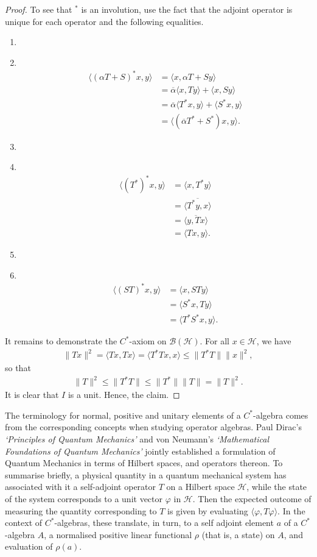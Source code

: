 \documentclass[12pt,a4paper]{report}
\theoremstyle{plain}
\theoremstyle{definition}
\newcommand{\1}{\mathbbm{1}}
\renewcommand{\H}{\mathcal{H}}
\newcommand{\B}{\mathcal{B}}
\newcommand{\BH}{\mathcal{\B(\H)}}
\renewcommand{\phi}{\varphi}
\newcommand\Item[1][]{ 				%
  \ifx\relax#1\relax  \item \else \item[#1] \fi
  \abovedisplayskip=0pt\abovedisplayshortskip=0pt~\vspace*{-\baselineskip}}
\begin{document}
\begin{proof}
	To see that $^\ast$ is an involution, use the fact that the adjoint 
	operator is unique for each operator and the following equalities.
	\begin{enumerate}
	\Item	\begin{align*}
				\langle (\alpha T+S)^\ast x,y\rangle 
			&=	\langle x, \alpha T+S y \rangle									\\
			&=	\overline{\alpha}\langle x,Ty\rangle + \langle x, Sy \rangle	\\
			&=	\overline{\alpha}\langle T^\ast x,y\rangle +
										 \langle S^\ast x, y \rangle			\\
			&=	\langle(\overline{\alpha} T^\ast + S^\ast) x, y \rangle.
			\end{align*}
	\Item 	\begin{align*}
				\langle (T^\ast)^\ast x,y\rangle 
			&=	\langle x, T^\ast y \rangle										\\
			&=	\overline{\langle T^\ast y,x \rangle}							\\
			&=	\overline{\langle y, Tx \rangle}								\\
			&=	\langle Tx,y\rangle.
			\end{align*}
	\Item	\begin{align*}
				\langle (ST)^\ast x,y \rangle
			&=	\langle x, STy \rangle											\\
			&=	\langle	S^\ast x,Ty \rangle										\\
			&=	\langle T^\ast S^\ast x,y \rangle.
		\end{align*}
	\end{enumerate}
	It remains to demonstrate the $C^\ast$-axiom on $\BH$. For all $x\in\H$, we have
	\begin{align*}
		\|Tx\|^2 = \langle Tx,Tx\rangle = \langle T^\ast Tx,x\rangle \leq \|T^\ast T\| \|x\|^2,
	\end{align*}
	so that
	\begin{align*}
		\|T\|^2 \leq \|T^\ast T\| \leq \|T^\ast\| \|T\| = \|T\|^2.
	\end{align*}
	It is clear that $I$ is a unit.
	Hence, the claim.
\end{proof} 



The terminology for normal, positive and unitary elements of a $C^\ast$-algebra comes from the 
corresponding concepts when studying operator algebras. 
Paul Dirac's \emph{`Principles of Quantum Mechanics'} and von Neumann's \emph{`Mathematical Foundations 
of Quantum Mechanics'} jointly established a formulation of Quantum Mechanics in terms of 
Hilbert spaces, and operators thereon. To summarise briefly, a physical quantity in a quantum mechanical 
system has associated with it a self-adjoint operator $T$ on a Hilbert space $\H$,  while the state of 
the system corresponds to a unit vector $\phi$ in $\H$. Then the expected outcome of measuring the 
quantity corresponding to $T$ is given by evaluating $\langle\phi, T\phi\rangle$. In the context of $C^
\ast$-algebras, these translate, in turn, to a self adjoint element $a$ of a $C^\ast$-algebra $A$, a 
normalised positive linear functional $\rho$ (that is, a state) on $A$, and evaluation of $\rho(a)$.
\end{document}
